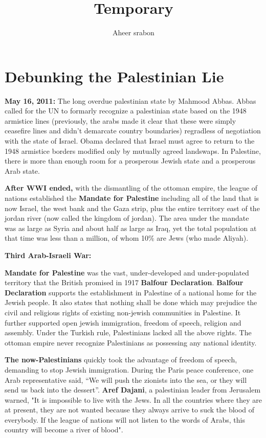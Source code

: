 

\title{Temporary}
\author{Aheer srabon}
\date{}


\maketitle

\section{Debunking the Palestinian Lie}
\textbf{May 16, 2011: } The long overdue palestinian state by Mahmood Abbas. Abbas called for the
UN to formarly recognize a palestinian state based on the 1948 armistice lines (previously, the
arabs made it clear that these were simply ceasefire lines and didn't demarcate country boundaries)
regradless of negotiation with the state of Israel. Obama declared that Israel must agree to return
to the 1948 armistice borders modified only by mutually agreed landswaps. In Palestine, there is 
more than enough room for a prosperous Jewish state and a prosperous Arab state.

\textbf{After WWI ended,} with the dismantling of the ottoman empire, the league of nations established
the \textbf{Mandate for Palestine} including all of the land that is now Israel, the west bank and the
Gaza strip, plus the entire territory east of the jordan river (now called the kingdom of jordan). The
area under the mandate was as large as Syria and about half as large as Iraq, yet the total population
at that time was less than a million, of whom 10\% are Jews (who made Aliyah).

\noindent\textbf{Third Arab-Israeli War: } 


\textbf{Mandate for Palestine} was the vast, under-developed and under-populated territory that the
British promised in 1917 \textbf{Balfour Declaration}. \textbf{Balfour Declaration} supports the
establishment in Palestine of a national home for the Jewish people. It also states that nothing
shall be done which may prejudice the civil and religious rights of existing non-jewish communities
in Palestine. It further supported open jewish immigration, freedom of speech, religion and assembly.
Under the Turkish rule, Palestinians lacked all the above rights. The ottoman empire never recognize
Palestinians as possessing any national identity.

\textbf{The now-Palestinians} quickly took the advantage of freedom of speech, demanding to stop Jewish
immigration. During the Paris peace conference, one Arab representative said, ``We will push the zionists
into the sea, or they will send us back into the dessert''. \textbf{Aref Dajani}, a palestinian leader
from Jerusalem warned, "It is impossible to live with the Jews. In all the countries where they are at 
present, they are not wanted because they always arrive to suck the blood of everybody. If the league
of nations will not listen to the words of Arabs, this country will become a river of blood".

